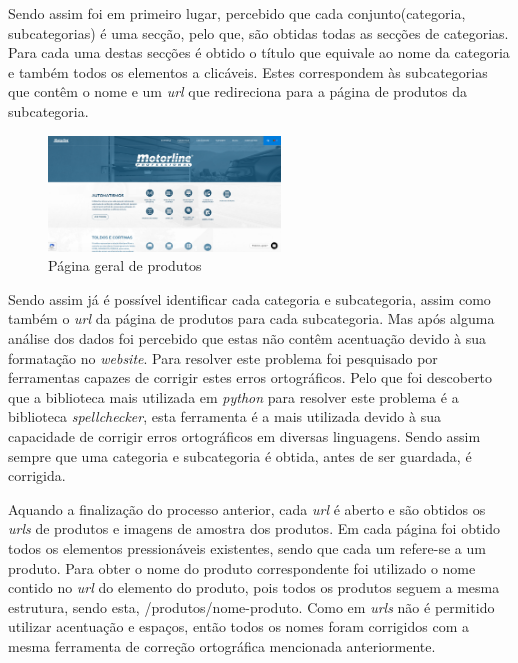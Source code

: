 Sendo assim foi em primeiro lugar, percebido que cada conjunto(categoria, subcategorias) é uma secção, pelo que, são obtidas todas as secções de categorias. Para cada uma destas secções é obtido o título que equivale ao nome da categoria e também todos os elementos a clicáveis. Estes correspondem às subcategorias que contêm o nome e um \textit{url} que redireciona para a página de produtos da subcategoria.

\begin{figure}[htb]
    \centering
    
    \includegraphics[width=0.55\textwidth]{images/implementacao/scraper/pagina_geral_produtos.png}
    \caption{Página geral de produtos}
    \label{fig:50}
\end{figure}

Sendo assim já é possível identificar cada categoria e subcategoria, assim como também o \textit{url} da página de produtos para cada subcategoria. Mas após alguma análise dos dados foi percebido que estas não contêm acentuação devido à sua formatação no \textit{website}. Para resolver este problema foi pesquisado por ferramentas capazes de corrigir estes erros ortográficos. Pelo que foi descoberto que a biblioteca mais utilizada em \textit{python} para resolver este problema 
é a biblioteca \textit{spellchecker}, esta ferramenta é a mais utilizada devido à sua capacidade de corrigir erros ortográficos em diversas linguagens. Sendo assim sempre que uma categoria e subcategoria é obtida, antes de ser guardada, é corrigida.

Aquando a finalização do processo anterior, cada \textit{url} é aberto e são obtidos os \textit{urls} de produtos e imagens de amostra dos produtos. Em cada página foi obtido todos os elementos pressionáveis existentes, sendo que cada um refere-se a um produto. Para obter o nome do produto correspondente foi utilizado o nome contido no \textit{url} do elemento do produto, pois todos os produtos seguem a mesma estrutura, sendo esta, /produtos/nome-produto. Como em \textit{urls} não é permitido utilizar acentuação e espaços, então todos os nomes foram corrigidos com a mesma ferramenta de correção ortográfica mencionada anteriormente.

